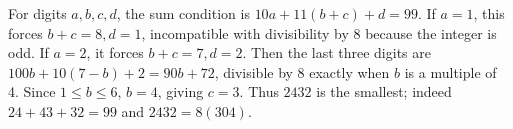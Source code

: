 For digits $a,b,c,d$, the sum condition is $10a+11(b+c)+d=99$. If $a=1$, this forces $b+c=8,d=1$, incompatible with divisibility by 8 because the integer is odd. If $a=2$, it forces $b+c=7,d=2$. Then the last three digits are $100b+10(7-b)+2=90b+72$, divisible by 8 exactly when $b$ is a multiple of 4. Since $1\le b\le6$, $b=4$, giving $c=3$. Thus $\boxed{2432}$ is the smallest; indeed $24+43+32=99$ and $2432=8(304)$.
